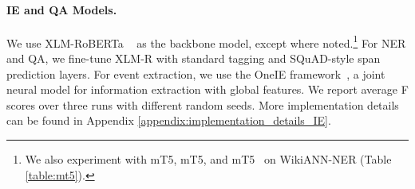 \documentclass[11pt,dvipsnames]{article}
\begin{document}
\renewcommand{\arraystretch}{1.25}
\begin{table}[t!]
\centering
\small
{}
\vspace{-5pt}
\caption{The detailed statistics of train/dev/test sets for each dataset.  \textbf{Avg. Length} represents the average number of tokens in each article/sentence, and \textbf{Avg.  \# of Spans} denotes the average number of annotated spans in each sentence (in each article for TyDiQA).} 
\vspace{-15pt}
\label{table:stat}
\end{table}







\paragraph{IE and QA Models.} We use  XLM-RoBERTa ~\citep{conneau2019xlmr} as the backbone  model, except where noted.\footnote{We also experiment with mT5, mT5, and mT5~\citep{xue2021mt5} on WikiANN-NER (Table \ref{table:mt5}). }
For NER and QA, we fine-tune XLM-R with standard tagging and SQuAD-style span prediction layers. For event extraction, we use the OneIE framework~\citep{lin2020oneie}, a joint neural model for information extraction with global features. We report average F scores over three runs with different random seeds. More implementation details can be found in Appendix \ref{appendix:implementation_details_IE}.
\end{document}
